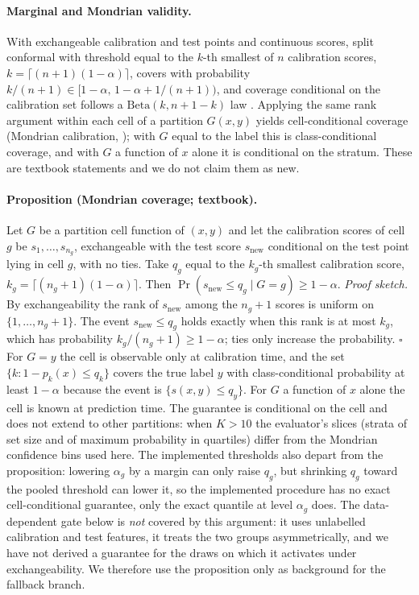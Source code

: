 \documentclass{article}
\begin{document}
\paragraph{Marginal and Mondrian validity.}
With exchangeable calibration and test points and continuous scores, split conformal with threshold equal to the $k$-th smallest of $n$ calibration scores, $k=\lceil (n+1)(1-\alpha)\rceil$, covers with probability $k/(n+1)\in[1-\alpha,\,1-\alpha+1/(n+1))$, and coverage conditional on the calibration set follows a $\mathrm{Beta}(k,n+1-k)$ law \citep{Vovk2005Algorithmic,Lei2018Distribution}. Applying the same rank argument within each cell of a partition $G(x,y)$ yields cell-conditional coverage (Mondrian calibration, \citealt{Vovk2005Algorithmic}); with $G$ equal to the label this is class-conditional coverage, and with $G$ a function of $x$ alone it is conditional on the stratum. These are textbook statements \citep{Vovk2005Algorithmic} and we do not claim them as new.

\paragraph{Proposition (Mondrian coverage; textbook).}
Let $G$ be a partition cell function of $(x,y)$ and let the calibration scores of cell $g$ be $s_1,\dots,s_{n_g}$, exchangeable with the test score $s_{\mathrm{new}}$ conditional on the test point lying in cell $g$, with no ties. Take $q_g$ equal to the $k_g$-th smallest calibration score, $k_g=\lceil(n_g+1)(1-\alpha)\rceil$. Then $\Pr(s_{\mathrm{new}}\le q_g\mid G=g)\ge1-\alpha$.
\emph{Proof sketch.} By exchangeability the rank of $s_{\mathrm{new}}$ among the $n_g+1$ scores is uniform on $\{1,\dots,n_g+1\}$. The event $s_{\mathrm{new}}\le q_g$ holds exactly when this rank is at most $k_g$, which has probability $k_g/(n_g+1)\ge1-\alpha$; ties only increase the probability. $\square$
For $G=y$ the cell is observable only at calibration time, and the set $\{k:1-p_k(x)\le q_k\}$ covers the true label $y$ with class-conditional probability at least $1-\alpha$ because the event is $\{s(x,y)\le q_y\}$. For $G$ a function of $x$ alone the cell is known at prediction time. The guarantee is conditional on the cell and does not extend to other partitions: when $K>10$ the evaluator's slices (strata of set size and of maximum probability in quartiles) differ from the Mondrian confidence bins used here. The implemented thresholds also depart from the proposition: lowering $\alpha_g$ by a margin can only raise $q_g$, but shrinking $q_g$ toward the pooled threshold can lower it, so the implemented procedure has no exact cell-conditional guarantee, only the exact quantile at level $\alpha_g$ does. The data-dependent gate below is \emph{not} covered by this argument: it uses unlabelled calibration and test features, it treats the two groups asymmetrically, and we have not derived a guarantee for the draws on which it activates under exchangeability. We therefore use the proposition only as background for the fallback branch.
\end{document}
